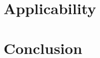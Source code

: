 \documentclass[]{article}
\begin{document}
\section{Applicability}

\section{Conclusion}

\newpage

 

\end{document}
